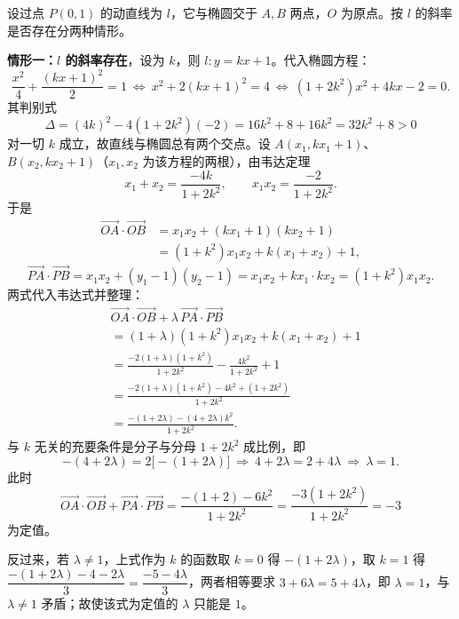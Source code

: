 \begin{answer}

设过点 \(P(0,1)\) 的动直线为 \(l\)，它与椭圆交于 \(A,B\) 两点，\(O\) 为原点。按 \(l\) 的斜率是否存在分两种情形。

\textbf{情形一：\(l\) 的斜率存在}，设为 \(k\)，则 \(l:y=kx+1\)。代入椭圆方程：
\nopagebreak[4]
\[
\frac{x^{2}}{4}+\frac{(kx+1)^{2}}{2}=1\ \Longleftrightarrow\ x^{2}+2(kx+1)^{2}=4\ \Longleftrightarrow\ (1+2k^{2})x^{2}+4kx-2=0 .
\]
其判别式
\nopagebreak[4]
\[
\Delta=(4k)^{2}-4(1+2k^{2})(-2)=16k^{2}+8+16k^{2}=32k^{2}+8>0
\]
对一切 \(k\) 成立，故直线与椭圆总有两个交点。设 \(A(x_{1},kx_{1}+1)\)、\(B(x_{2},kx_{2}+1)\)（\(x_{1},x_{2}\) 为该方程的两根），由韦达定理
\nopagebreak[4]
\[
x_{1}+x_{2}=\frac{-4k}{1+2k^{2}},\qquad x_{1}x_{2}=\frac{-2}{1+2k^{2}} .
\]
于是
\nopagebreak[4]
\[
\begin{aligned}
\overrightarrow{OA}\cdot\overrightarrow{OB}&=x_{1}x_{2}+(kx_{1}+1)(kx_{2}+1)\\
&=(1+k^{2})x_{1}x_{2}+k(x_{1}+x_{2})+1,
\end{aligned}
\]
\nopagebreak[4]
\[
\overrightarrow{PA}\cdot\overrightarrow{PB}=x_{1}x_{2}+(y_{1}-1)(y_{2}-1)=x_{1}x_{2}+kx_{1}\cdot kx_{2}=(1+k^{2})x_{1}x_{2} .
\]
两式代入韦达式并整理：
\nopagebreak[4]
\[
\begin{aligned}
&\overrightarrow{OA}\cdot\overrightarrow{OB}+\lambda\,\overrightarrow{PA}\cdot\overrightarrow{PB}\\
&=(1+\lambda)(1+k^{2})x_{1}x_{2}+k(x_{1}+x_{2})+1\\
&=\frac{-2(1+\lambda)(1+k^{2})}{1+2k^{2}}-\frac{4k^{2}}{1+2k^{2}}+1\\
&=\frac{-2(1+\lambda)(1+k^{2})-4k^{2}+(1+2k^{2})}{1+2k^{2}}\\
&=\frac{-(1+2\lambda)-(4+2\lambda)k^{2}}{1+2k^{2}} .
\end{aligned}
\]
与 \(k\) 无关的充要条件是分子与分母 \(1+2k^{2}\) 成比例，即
\nopagebreak[4]
\[
-(4+2\lambda)=2\bigl[-(1+2\lambda)\bigr]\ \Longrightarrow\ 4+2\lambda=2+4\lambda\ \Longrightarrow\ \lambda=1 .
\]
此时
\nopagebreak[4]
\[
\overrightarrow{OA}\cdot\overrightarrow{OB}+\overrightarrow{PA}\cdot\overrightarrow{PB}
=\frac{-(1+2)-6k^{2}}{1+2k^{2}}=\frac{-3(1+2k^{2})}{1+2k^{2}}=-3
\]
为定值。

反过来，若 \(\lambda\neq1\)，上式作为 \(k\) 的函数取 \(k=0\) 得 \(-(1+2\lambda)\)，取 \(k=1\) 得 \(\dfrac{-(1+2\lambda)-4-2\lambda}{3}=\dfrac{-5-4\lambda}{3}\)，两者相等要求 \(3+6\lambda=5+4\lambda\)，即 \(\lambda=1\)，与 \(\lambda\neq1\) 矛盾；故使该式为定值的 \(\lambda\) 只能是 \(1\)。


\end{answer}

